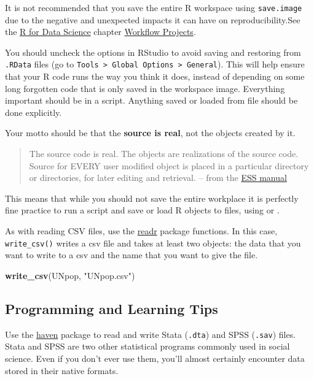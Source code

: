 \documentclass[]{book}
\newenvironment{Shaded}{\begin{snugshade}}{\end{snugshade}}
\newcommand{\KeywordTok}[1]{\textcolor[rgb]{0.13,0.29,0.53}{\textbf{#1}}}
\newcommand{\StringTok}[1]{\textcolor[rgb]{0.31,0.60,0.02}{#1}}
\newcommand{\NormalTok}[1]{#1}
\theoremstyle{definition}
\theoremstyle{definition}
\theoremstyle{definition}
\theoremstyle{remark}
\begin{document}
It is not recommended that you save the entire R workspace using
\texttt{save.image} due to the negative and unexpected impacts it can
have on reproducibility.See the \href{http://r4ds.had.co.nz/}{R for Data
Science} chapter
\href{http://r4ds.had.co.nz/workflow-projects.html}{Workflow Projects}.

You should uncheck the options in RStudio to avoid saving and restoring
from \texttt{.RData} files (go to
\texttt{Tools\ \textgreater{}\ Global\ Options\ \textgreater{}\ General}).
This will help ensure that your R code runs the way you think it does,
instead of depending on some long forgotten code that is only saved in
the workspace image. Everything important should be in a script.
Anything saved or loaded from file should be done explicitly.

Your motto should be that the \textbf{source is real}, not the objects
created by it.

\begin{quote}
The source code is real. The objects are realizations of the source
code. Source for EVERY user modified object is placed in a particular
directory or directories, for later editing and retrieval. -- from the
\href{https://ess.r-project.org/Manual/ess.html\#Philosophies-for-using-ESS_0028S_0029}{ESS
manual}
\end{quote}

This means that while you should not save the entire workplace it is
perfectly fine practice to run a script and save or load R objects to
files, using or .

As with reading CSV files, use the
\href{http://readr.tidyverse.org/}{readr} package functions. In this
case, \texttt{write\_csv()} writes a csv file and takes at least two
objects: the data that you want to write to a csv and the name that you
want to give the file.

\begin{Shaded}
\begin{Highlighting}[]
\KeywordTok{write_csv}\NormalTok{(UNpop, }\StringTok{"UNpop.csv"}\NormalTok{)}
\end{Highlighting}
\end{Shaded}

\subsection{Programming and Learning
Tips}\label{programming-and-learning-tips}

Use the \href{http://haven.tidyverse.org/}{haven} package to read and
write Stata (\texttt{.dta}) and SPSS (\texttt{.sav}) files. Stata and
SPSS are two other statistical programs commonly used in social science.
Even if you don't ever use them, you'll almost certainly encounter data
stored in their native formats.
\end{document}
